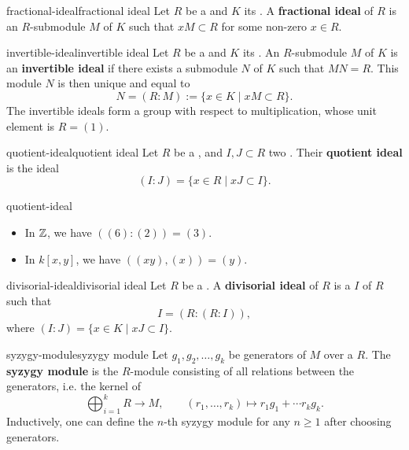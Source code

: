 \begin{topic}{fractional-ideal}{fractional ideal}
    Let $R$ be a  and $K$ its . A \textbf{fractional ideal} of $R$ is an $R$-submodule $M$ of $K$ such that $xM \subset R$ for some non-zero $x \in R$.
\end{topic}

\begin{topic}{invertible-ideal}{invertible ideal}
    Let $R$ be a  and $K$ its . An $R$-submodule $M$ of $K$ is an \textbf{invertible ideal} if there exists a submodule $N$ of $K$ such that $MN = R$. This module $N$ is then unique and equal to
    \[ N = (R : M) := \{ x \in K \mid xM \subset R \} . \]
    The invertible ideals form a group with respect to multiplication, whose unit element is $R = (1)$.
\end{topic}

\begin{topic}{quotient-ideal}{quotient ideal}
    Let $R$ be a , and $I, J \subset R$ two . Their \textbf{quotient ideal} is the ideal
    \[ (I : J) = \{ x \in R \mid xJ \subset I \} . \]
\end{topic}

\begin{example}{quotient-ideal}
    \begin{itemize}
        \item In $\mathbb{Z}$, we have $((6) : (2)) = (3)$.
        \item In $k[x, y]$, we have $((xy), (x)) = (y)$.
    \end{itemize}
\end{example}

\begin{topic}{divisorial-ideal}{divisorial ideal}
    Let $R$ be a . A \textbf{divisorial ideal} of $R$ is a  $I$ of $R$ such that
    \[ I = (R : (R : I)) , \]
    where $(I : J) = \{ x \in K \mid xJ \subset I \}$.
\end{topic}

\begin{topic}{syzygy-module}{syzygy module}
    Let $g_1, g_2, \ldots, g_k$ be generators of  $M$ over a  $R$. The \textbf{syzygy module} is the $R$-module consisting of all relations between the generators, i.e. the kernel of
    \[ \bigoplus_{i = 1}^{k} R \to M, \qquad (r_1, \ldots, r_k) \mapsto r_1 g_1 + \cdots r_k g_k . \]
    Inductively, one can define the $n$-th syzygy module for any $n \ge 1$ after choosing generators.
\end{topic}

